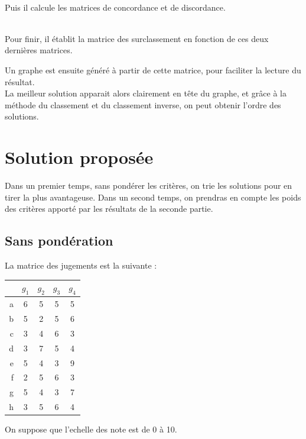 ~\\
Puis il calcule les matrices de concordance et de discordance.

~\\
Pour finir, il établit la matrice des surclassement en fonction de ces deux dernières matrices.


Un graphe est ensuite généré à partir de cette matrice, pour faciliter la lecture du résultat.\\
La meilleur solution apparait alors clairement en tête du graphe, et grâce à la méthode du classement et du classement inverse, on peut obtenir l'ordre des solutions.

\section{Solution proposée}

Dans un premier temps, sans pondérer les critères, on trie les solutions pour en tirer la plus avantageuse. Dans un second temps, on prendras en compte les poids des critères apporté par les résultats de la seconde partie.

\subsection{Sans pondération}

La matrice des jugements est la suivante :\\
\begin{center}
\begin{tabular}{r | c c c c}
~ & $g_1$ & $g_2$ & $g_3$ & $g_4$ \\ \hline
a & 6 & 5 & 5 & 5 \\
b & 5 & 2 & 5 & 6 \\
c & 3 & 4 & 6 & 3 \\
d & 3 & 7 & 5 & 4 \\
e & 5 & 4 & 3 & 9 \\
f & 2 & 5 & 6 & 3 \\
g & 5 & 4 & 3 & 7 \\
h & 3 & 5 & 6 & 4 \\
\end{tabular}
\end{center}

On suppose que l'echelle des note est de 0 à 10.\\

